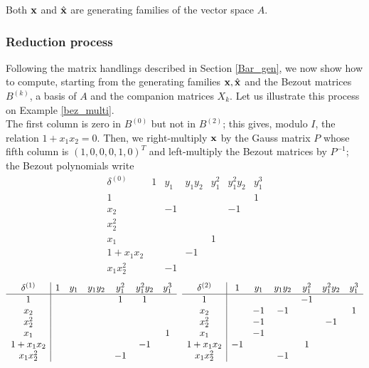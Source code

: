 \documentclass{standalone}
\begin{document}
\begin{prop}
Both $\bold{x}$ and $\hat{\bold{x}}$ are generating families of the vector space $A$.
\end{prop}

\subsubsection{Reduction process}
\label{sec:reduction_process}
Following the matrix handlings described in Section \ref{Bar_gen}, we now show how to compute, starting from the generating families $\bold{x}, \hat{\bold{x}}$ and the Bezout matrices $B^{(k)}$, a basis of $A$ and the companion matrices $X_k$.
Let us illustrate this process on Example \ref{bez_multi}.\\
The first column is zero in $B^{(0)}$ but not in $B^{(2)}$; this gives, modulo $I$, the relation $1 + x_1x_2 = 0$. Then, we right-multiply $\bold{x}$ by the Gauss matrix $P$ whose fifth column is $(1, 0, 0, 0, 1, 0)^{T}$ and left-multiply the Bezout matrices by $P^{-1}$; the Bezout polynomials write 
$$
\begin{array}{c|cccccc}
	\delta^{(0)} & 1 & y_1 & y_1y_2 & y_1^2 & y_1^2y_2 & y_1^3 \\
	\hline
	1 &  &  &  &  &  & 1\\
	x_2 &  & -1 &  &  & -1 & \\
	x_2^2 &  &  &  &  &  & \\
	x_1 &  &  &  & 1 &  & \\
	1+x_1x_2 &  &  & -1 &  &  & \\
	x_1x_2^2 &  & -1 &  &  &  &
\end{array}$$
$$
\begin{array}{c|cccccc}
	\delta^{(1)} & 1 & y_1 & y_1y_2 & y_1^2 & y_1^2y_2 & y_1^3 \\
	\hline
	1 &  &  &  & 1 & 1 & \\
	x_2 &  &  &  &  &  & \\
	x_2^2 &  &  &  &  &  & \\
	x_1 &  &  &  &  &  & 1\\
	1+x_1x_2 &  &  &  &  & -1 & \\
	x_1x_2^2 &  &  &  & -1 &  &
\end{array}
\hspace{0.2cm}
\begin{array}{c|cccccc}
	\delta^{(2)} & 1 & y_1 & y_1y_2 & y_1^2 & y_1^2y_2 & y_1^3 \\
	\hline
	1 &  &  &  & -1 &  & \\
	x_2 &  & -1 & -1 &  &  & 1\\
	x_2^2 &  & -1 &  &  & -1 & \\
	x_1 &  & -1 &  &  &  & \\
	1+x_1x_2 & -1 &  &  & 1 &  & \\
	x_1x_2^2 &  &  & -1 &  &  &
\end{array}
$$
\end{document}
